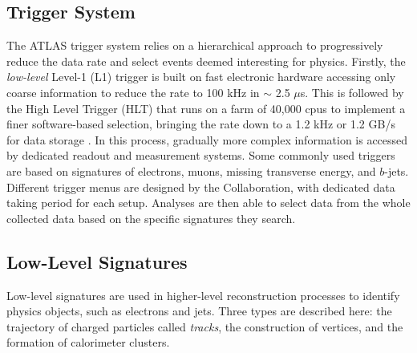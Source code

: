 \subsection{Trigger System}\label{sub-sec-trigger}
The ATLAS trigger system relies on a hierarchical approach to progressively reduce the data rate and select events deemed interesting for physics. Firstly, the \textit{low-level} Level-1 (L1) trigger is built on fast electronic hardware accessing only coarse information to reduce the rate to 100 kHz in $\sim$ 2.5 $\mu$s. This is followed by the High Level Trigger (HLT) that runs on a farm of 40,000 \glspl{cpu} to implement a finer software-based selection, bringing the rate down to a 1.2 kHz or 1.2 GB/s for data storage \cite{TriggerATLAScollaboration_2020}. In this process, gradually more complex information is accessed by dedicated readout and measurement systems. Some commonly used triggers are based on signatures of electrons, muons, missing transverse energy, and $b$-jets. Different trigger menus are designed by the Collaboration, with dedicated data taking period for each setup. Analyses are then able to select data from the whole collected data based on the specific signatures they search. 

\subsection{Low-Level Signatures}
Low-level signatures are used in higher-level reconstruction processes to identify physics objects, such as electrons and jets. Three types are described here: the trajectory of charged particles called \textit{tracks}, the construction of vertices, and the formation of calorimeter clusters. \\

